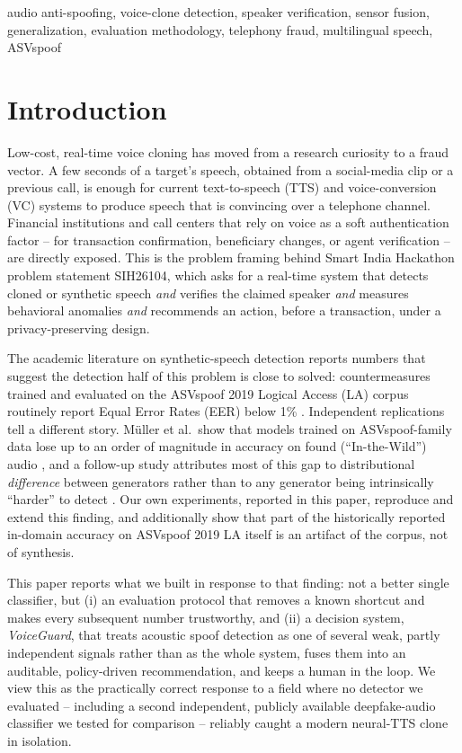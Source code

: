 \documentclass[conference]{IEEEtran}
\begin{document}
\begin{IEEEkeywords}
audio anti-spoofing, voice-clone detection, speaker verification,
sensor fusion, generalization, evaluation methodology, telephony fraud,
multilingual speech, ASVspoof
\end{IEEEkeywords}

\section{Introduction}

Low-cost, real-time voice cloning has moved from a research curiosity to
a fraud vector. A few seconds of a target's speech, obtained from a
social-media clip or a previous call, is enough for current
text-to-speech (TTS) and voice-conversion (VC) systems to produce
speech that is convincing over a telephone channel. Financial
institutions and call centers that rely on voice as a soft
authentication factor -- for transaction confirmation, beneficiary
changes, or agent verification -- are directly exposed. This is the
problem framing behind Smart India Hackathon problem statement SIH26104,
which asks for a real-time system that detects cloned or synthetic
speech \emph{and} verifies the claimed speaker \emph{and} measures
behavioral anomalies \emph{and} recommends an action, before a
transaction, under a privacy-preserving design.

The academic literature on synthetic-speech detection reports numbers
that suggest the detection half of this problem is close to solved:
countermeasures trained and evaluated on the ASVspoof 2019 Logical
Access (LA) corpus routinely report Equal Error Rates (EER) below 1\%
\cite{aasist}. Independent replications tell a different story. M\"uller
et al.\ show that models trained on ASVspoof-family data lose up to an
order of magnitude in accuracy on found (``In-the-Wild'') audio
\cite{mueller2022generalize}, and a follow-up study attributes most of
this gap to distributional \emph{difference} between generators rather
than to any generator being intrinsically ``harder'' to detect
\cite{mueller2024harder}. Our own experiments, reported in this paper,
reproduce and extend this finding, and additionally show that part of
the historically reported in-domain accuracy on ASVspoof 2019 LA itself
is an artifact of the corpus, not of synthesis.

This paper reports what we built in response to that finding: not a
better single classifier, but (i) an evaluation protocol that removes a
known shortcut and makes every subsequent number trustworthy, and (ii)
a decision system, \emph{VoiceGuard}, that treats acoustic spoof
detection as one of several weak, partly independent signals rather
than as the whole system, fuses them into an auditable, policy-driven
recommendation, and keeps a human in the loop. We view this as the
practically correct response to a field where no detector we evaluated
-- including a second independent, publicly available deepfake-audio
classifier we tested for comparison -- reliably caught a modern
neural-TTS clone in isolation.
\end{document}
